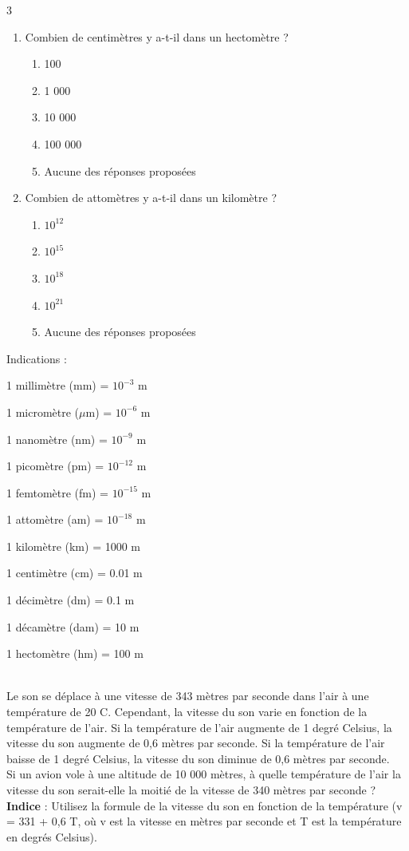 \documentclass[11pt,a4paper]{article}
\newcommand{\cadreblanc}[1]{%
\medskip\framebox[\linewidth][c]{%
\rule{0mm}{#1mm}}\par
\medskip}
\begin{document}
\begin{multicols}{3}
\begin{enumerate}
\item Combien de centimètres y a-t-il dans un hectomètre ?
\begin{enumerate}
\item[a.] 100
\item[b.] 1 000
\item[c.] 10 000
\item[d.] 100 000
\item[e.] Aucune des réponses proposées
\end{enumerate}
\item Combien de attomètres y a-t-il dans un kilomètre ?
\begin{enumerate}
\item[a.] $10^{12}$
\item[b.] $10^{15}$
\item[c.] $10^{18}$
\item[d.] $10^{21}$
\item[e.] Aucune des réponses proposées
\end{enumerate}
\end{enumerate}

\dotfill

Indications :

1 millimètre (mm) = $10^{-3}$ m

1 micromètre ($\mu$m) = $10^{-6}$ m

1 nanomètre (nm) = $10^{-9}$ m

1 picomètre (pm) = $10^{-12}$ m

1 femtomètre (fm) = $10^{-15}$ m

1 attomètre (am) = $10^{-18}$ m

1 kilomètre (km) = 1000 m

1 centimètre (cm) = 0.01 m

1 décimètre (dm) = 0.1 m

1 décamètre (dam) = 10 m

1 hectomètre (hm) = 100 m

\end{multicols}
\\[2mm]

Le son se déplace à une vitesse de 343 mètres par seconde dans l'air à une température de 20 C. Cependant, la vitesse du son varie en fonction de la température de l'air. Si la température de l'air augmente de 1 degré Celsius, la vitesse du son augmente de 0,6 mètres par seconde. Si la température de l'air baisse de 1 degré Celsius, la vitesse du son diminue de 0,6 mètres par seconde.\\
Si un avion vole à une altitude de 10 000 mètres, à quelle température de l'air la vitesse du son serait-elle la moitié de la vitesse de 340 mètres par seconde ?\\
\textbf{Indice} : Utilisez la formule de la vitesse du son en fonction de la température (v = 331 + 0,6 T, où v est la vitesse en mètres par seconde et T est la température en degrés Celsius).

\cadreblanc{10}
\end{document}
